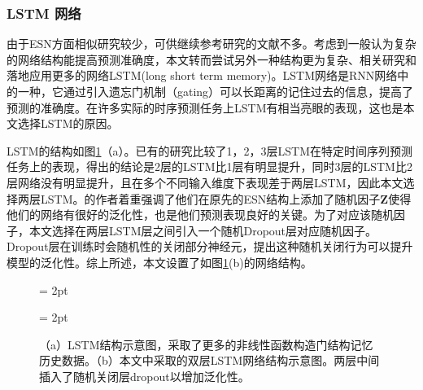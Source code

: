 \subsubsection{LSTM 网络}
由于ESN方面相似研究较少，可供继续参考研究的文献不多。考虑到一般认为复杂的网络结构能提高预测准确度，本文转而尝试另外一种结构更为复杂、相关研究和落地应用更多的网络LSTM(long short term memory)。LSTM网络是RNN网络中的一种，它通过引入遗忘门机制（gating）可以长距离的记住过去的信息\cite{LSTM}，提高了预测的准确度。在许多实际的时序预测任务上LSTM有相当亮眼的表现，这也是本文选择LSTM的原因。

LSTM的结构如图\ref{fig:lstm}（a）。已有的研究比较了1，2，3层LSTM在特定时间序列预测任务上的表现，得出的结论是2层的LSTM比1层有明显提升，同时3层的LSTM比2层网络没有明显提升，且在多个不同输入维度下表现差于两层LSTM，因此本文选择两层LSTM\cite{Karpathy2015VisualizingAU}。\cite{Anton2023}的作者着重强调了他们在原先的ESN结构上添加了随机因子$\bm Z$使得他们的网络有很好的泛化性，也是他们预测表现良好的关键。为了对应该随机因子，本文选择在两层LSTM层之间引入一个随机Dropout层对应随机因子。Dropout层在训练时会随机性的关闭部分神经元，\cite{dropout}提出这种随机关闭行为可以提升模型的泛化性。综上所述，本文设置了如图\ref{fig:lstm}(b)的网络结构。
\begin{figure}[H]
	\subfigbottomskip = 2pt
	\begin{minipage}[h]{1\linewidth}
	\centering
	\end{minipage}
	\quad
	\subfigbottomskip = 2pt
	\subfigcapskip=-5pt
	\begin{minipage}[h]{\linewidth}
	\centering
	\end{minipage}
	\quad
	\caption{（a）LSTM结构示意图，采取了更多的非线性函数构造门结构记忆历史数据。（b）本文中采取的双层LSTM网络结构示意图。两层中间插入了随机关闭层dropout以增加泛化性。}
\label{fig:lstm}
\end{figure}

